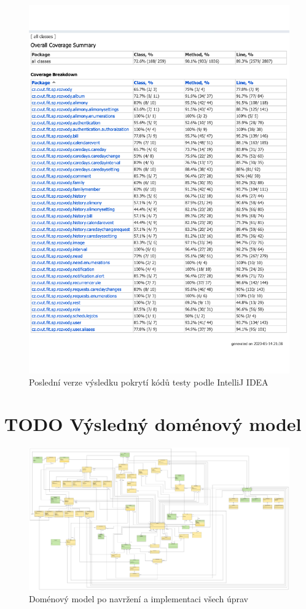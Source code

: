     \begin{figure}\centering
	    \includegraphics[width=1.0\textwidth]{pdfs/IntelliJ-IDEA-coverage-runner-results}
	    \caption[Pokrytí kódů testy podle JaCoCo]{Poslední verze výsledku pokrytí kódů testy podle IntelliJ IDEA}\label{image:intellij-coverage-result}
    \end{figure}
\chapter{TODO Výsledný doménový model}\label{dodatek:DomainModel2}
    \begin{figure}\centering
	    \includegraphics[angle=90, width=1.0\textwidth]{pdfs/Domain-Model}
	    \caption[TODO Výsledný doménový model]{Doménový model po navržení a implementaci všech úprav}\label{image:DomainModel2}
    \end{figure}
